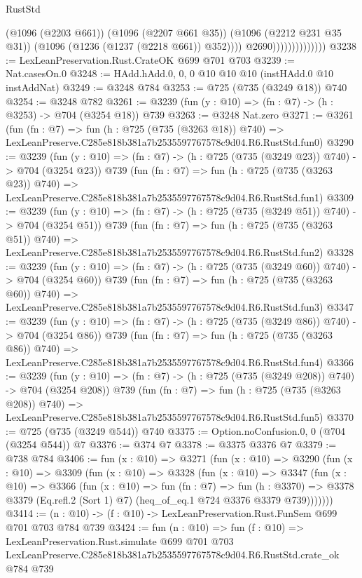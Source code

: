 \begin{lexlean}{RustStd}
\begin{coremodule}
                                    (@1096 (@2203 @661))
                                    (@1096 (@2207 @661 @35))
                                    (@1096 (@2212 @231 @35 @31))
                                    (@1096 (@1236 (@1237 (@2218 @661)) @352))))
                                @2690))))))))))))))
@3238 := LexLeanPreservation.Rust.CrateOK @699 @701 @703
@3239 := Nat.casesOn.{0}
@3248 := HAdd.hAdd.{0, 0, 0} @10 @10 @10 (instHAdd.{0} @10 instAddNat)
@3249 := @3248 @784
@3253 := @725 (@735 (@3249 @18)) @740
@3254 := @3248 @782
@3261 := @3239 (fun (y : @10) => (fn : @7) -> (h : @3253) -> @704 (@3254 @18)) @739
@3263 := @3248 Nat.zero
@3271 := @3261
    (fun (fn : @7) =>
    fun (h : @725 (@735 (@3263 @18)) @740) =>
    LexLeanPreserve.C285e818b381a7b2535597767578c9d04.R6.RustStd.fun0)
@3290 := @3239
    (fun (y : @10) => (fn : @7) -> (h : @725 (@735 (@3249 @23)) @740) -> @704 (@3254 @23))
    @739
    (fun (fn : @7) =>
    fun (h : @725 (@735 (@3263 @23)) @740) =>
    LexLeanPreserve.C285e818b381a7b2535597767578c9d04.R6.RustStd.fun1)
@3309 := @3239
    (fun (y : @10) => (fn : @7) -> (h : @725 (@735 (@3249 @51)) @740) -> @704 (@3254 @51))
    @739
    (fun (fn : @7) =>
    fun (h : @725 (@735 (@3263 @51)) @740) =>
    LexLeanPreserve.C285e818b381a7b2535597767578c9d04.R6.RustStd.fun2)
@3328 := @3239
    (fun (y : @10) => (fn : @7) -> (h : @725 (@735 (@3249 @60)) @740) -> @704 (@3254 @60))
    @739
    (fun (fn : @7) =>
    fun (h : @725 (@735 (@3263 @60)) @740) =>
    LexLeanPreserve.C285e818b381a7b2535597767578c9d04.R6.RustStd.fun3)
@3347 := @3239
    (fun (y : @10) => (fn : @7) -> (h : @725 (@735 (@3249 @86)) @740) -> @704 (@3254 @86))
    @739
    (fun (fn : @7) =>
    fun (h : @725 (@735 (@3263 @86)) @740) =>
    LexLeanPreserve.C285e818b381a7b2535597767578c9d04.R6.RustStd.fun4)
@3366 := @3239
    (fun (y : @10) => (fn : @7) -> (h : @725 (@735 (@3249 @208)) @740) -> @704 (@3254 @208))
    @739
    (fun (fn : @7) =>
    fun (h : @725 (@735 (@3263 @208)) @740) =>
    LexLeanPreserve.C285e818b381a7b2535597767578c9d04.R6.RustStd.fun5)
@3370 := @725 (@735 (@3249 @544)) @740
@3375 := Option.noConfusion.{0, 0} (@704 (@3254 @544)) @7
@3376 := @374 @7
@3378 := @3375 @3376 @7
@3379 := @738 @784
@3406 := fun (x : @10) =>
  @3271
    (fun (x : @10) =>
    @3290
      (fun (x : @10) =>
      @3309
        (fun (x : @10) =>
        @3328
          (fun (x : @10) =>
          @3347
            (fun (x : @10) =>
            @3366
              (fun (x : @10) =>
              fun (fn : @7) =>
              fun (h : @3370) =>
              @3378 @3379 (Eq.refl.{2} (Sort 1) @7) (heq_of_eq.{1} @724 @3376 @3379 @739)))))))
@3414 := (n : @10) -> (f : @10) -> LexLeanPreservation.Rust.FunSem @699 @701 @703 @784 @739
@3424 := fun (n : @10) =>
  fun (f : @10) =>
  LexLeanPreservation.Rust.simulate
    @699
    @701
    @703
    LexLeanPreserve.C285e818b381a7b2535597767578c9d04.R6.RustStd.crate_ok
    @784
    @739
\end{coremodule}
\end{lexlean}
